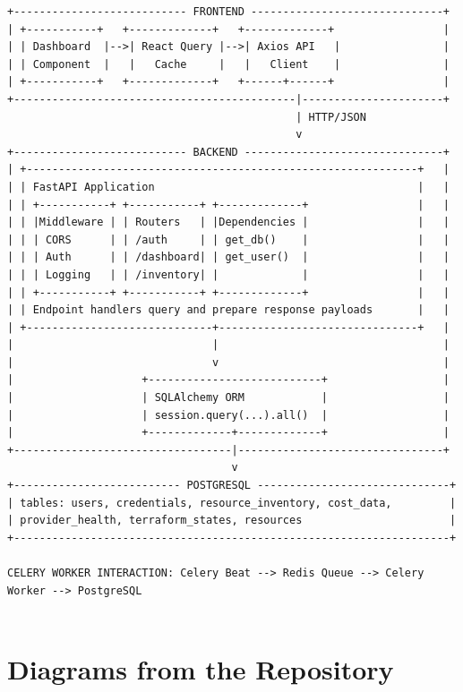 \begin{lstlisting}[numbers=none,basicstyle=\ttfamily\tiny,caption={Component Interaction Diagram Adapted from docs/README.md}]
+--------------------------- FRONTEND ------------------------------+
| +-----------+   +-------------+   +-------------+                 |
| | Dashboard  |-->| React Query |-->| Axios API   |                |
| | Component  |   |   Cache     |   |   Client    |                |
| +-----------+   +-------------+   +------+------+                 |
+--------------------------------------------|----------------------+
                                             | HTTP/JSON
                                             v
+--------------------------- BACKEND -------------------------------+
| +-------------------------------------------------------------+   |
| | FastAPI Application                                         |   |
| | +-----------+ +-----------+ +-------------+                 |   |
| | |Middleware | | Routers   | |Dependencies |                 |   |
| | | CORS      | | /auth     | | get_db()    |                 |   |
| | | Auth      | | /dashboard| | get_user()  |                 |   |
| | | Logging   | | /inventory| |             |                 |   |
| | +-----------+ +-----------+ +-------------+                 |   |
| | Endpoint handlers query and prepare response payloads       |   |
| +-----------------------------+-------------------------------+   |
|                               |                                   |
|                               v                                   |
|                    +---------------------------+                  |
|                    | SQLAlchemy ORM            |                  |
|                    | session.query(...).all()  |                  |
|                    +-------------+-------------+                  |
+----------------------------------|--------------------------------+
                                   v
+-------------------------- POSTGRESQL ------------------------------+
| tables: users, credentials, resource_inventory, cost_data,         |
| provider_health, terraform_states, resources                       |
+--------------------------------------------------------------------+

CELERY WORKER INTERACTION: Celery Beat --> Redis Queue --> Celery Worker --> PostgreSQL


\end{lstlisting}

\section{Diagrams from the Repository}

